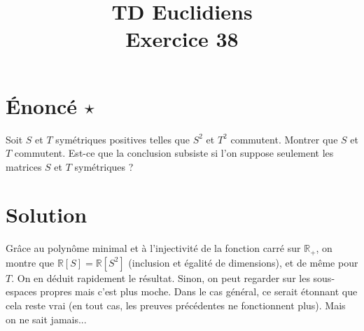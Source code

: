 \documentclass[french]{article}
\title{TD Euclidiens\\ Exercice 38}
\date{}
\newcommand{\R}{\mathbb{R}}
\begin{document}
\maketitle

\section{Énoncé $\star$}
Soit $S$ et $T$ symétriques positives telles que $S^2$ et $T^2$ commutent. Montrer que $S$ et $T$ commutent. Est-ce que la conclusion subsiste si l'on suppose seulement les matrices $S$ et $T$ symétriques ?
\section{Solution}
Grâce au polynôme minimal et à l'injectivité de la fonction carré sur $\R_+$, on montre que $\R[S]=\R[S^2]$ (inclusion et égalité de dimensions), et de même pour $T$. On en déduit rapidement le résultat. Sinon, on peut regarder sur les sous-espaces propres mais c'est plus moche. Dans le cas général, ce serait étonnant que cela reste vrai (en tout cas, les preuves précédentes ne fonctionnent plus). Mais on ne sait jamais...
\end{document}
